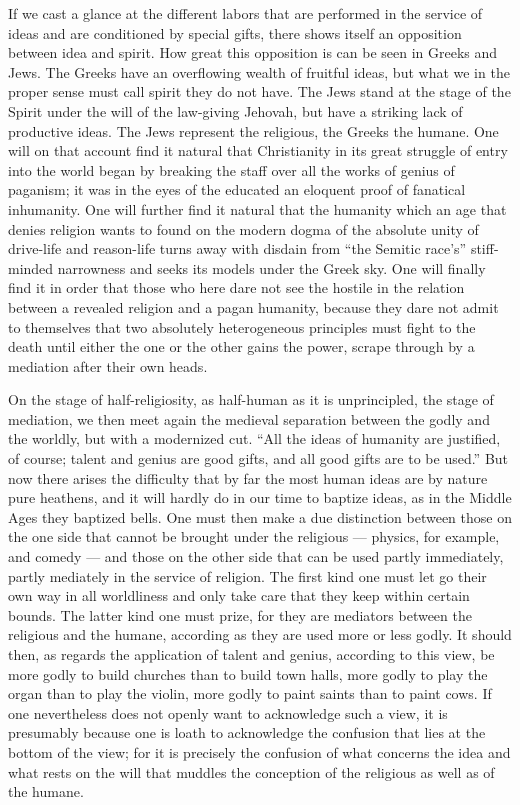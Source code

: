 \documentclass[12pt,a4paper,openany]{book}
\newcommand{\opage}[1]{\marginnote{\footnotesize\textit{[#1]}}}
\begin{document}
\setcounter{footnote}{0}%
\opage{80}If we cast a glance at the different labors that
are performed in the service of ideas and are conditioned by special
gifts, there shows itself an opposition between idea and
spirit. How great this opposition is can be seen in
Greeks and Jews. The Greeks have an overflowing
wealth of fruitful ideas, but what we in the proper sense
must call spirit they do not have. The Jews stand
at the stage of the Spirit under the will of the law-giving Jehovah,
but have a striking lack of productive ideas.
The Jews represent the religious, the Greeks the humane.
One will on that account find it natural that Christianity
in its great struggle of entry into the world began by
breaking the staff over all the works of genius of paganism; it
was in the eyes of the educated an eloquent proof of fanatical
inhumanity. One will further find it natural that
the humanity which an age that denies religion wants to
found on the modern dogma of the absolute unity of drive-life and
reason-life turns away with disdain from
``the Semitic race's'' stiff-minded narrowness
and seeks its models under the Greek sky. One will
finally find it in order that those who here dare not
see the hostile in the relation between a revealed religion
and a pagan humanity, because they dare not admit
to themselves that two absolutely heterogeneous principles must fight
to the death until either the one or the other gains
the power, scrape through by a mediation after their
own heads.

On the stage of half-religiosity, as half-human as it is unprincipled,
the stage of mediation, we then meet again the medieval
separation between the godly and the worldly, but with a
modernized cut. ``All the ideas of humanity are justified,
of course; talent and genius are good gifts,
and all good gifts are to be used.'' But now there arises the
difficulty that by far the most human ideas are by nature
pure heathens, and it will hardly do in our time
to baptize ideas, as in the Middle Ages they baptized bells.
One must then make a due distinction between those on the
\setcounter{footnote}{0}%
\opage{81}one side that cannot be brought under the religious ---
physics, for example, and comedy --- and those on the other
side that can be used partly immediately, partly mediately
in the service of religion. The first kind one must let
go their own way in all worldliness and only take care
that they keep within certain bounds. The latter
kind one must prize, for they are mediators between
the religious and the humane, according as they are used
more or less godly. It should then, as regards the application
of talent and genius, according to this view,
be more godly to build churches than to build town halls,
more godly to play the organ than to play the violin,
more godly to paint saints than to paint cows. If
one nevertheless does not openly want to acknowledge such
a view, it is presumably because one is loath to acknowledge
the confusion that lies at the bottom of
the view; for it is precisely the confusion of what
concerns the idea and what rests on the will
that muddles the conception of the religious as well as of
the humane.
\end{document}
